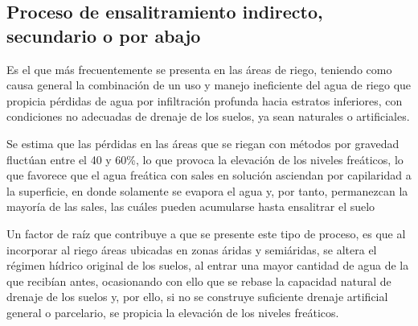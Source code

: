\subsection{Proceso de ensalitramiento indirecto, secundario o por abajo}
Es el que más frecuentemente se presenta en las áreas de riego, teniendo como causa general la combinación de un uso y manejo ineficiente del agua de riego que propicia pérdidas de agua por infiltración profunda hacia estratos inferiores, con condiciones no adecuadas de drenaje de los suelos, ya sean naturales o artificiales.

Se estima que las pérdidas en las áreas que se riegan con métodos por gravedad fluctúan entre el 40 y 60\%, lo que provoca la elevación de los niveles freáticos, lo que favorece que el agua freática con sales en solución asciendan por capilaridad a la superficie, en donde solamente se evapora el agua y, por tanto, permanezcan la mayoría de las sales, las cuáles pueden acumularse hasta ensalitrar el suelo

Un factor de raíz que contribuye a que se presente este tipo de proceso, es que al incorporar al riego áreas ubicadas en zonas áridas y semiáridas, se altera el régimen hídrico original de los suelos, al entrar una mayor cantidad de agua de la que recibían antes, ocasionando con ello que se rebase la capacidad natural de drenaje de los suelos y, por ello, si no se construye suficiente drenaje artificial general o parcelario, se propicia la elevación de los niveles freáticos.

